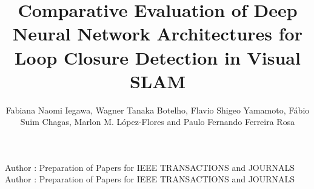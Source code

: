 \documentclass{ieeeaccess}
\begin{document}

\title{Comparative Evaluation of Deep Neural Network Architectures for Loop Closure Detection in Visual SLAM}

\author{Fabiana Naomi Iegawa, Wagner Tanaka Botelho, Flavio Shigeo Yamamoto, Fábio Suim Chagas, Marlon M. López-Flores and Paulo Fernando Ferreira Rosa}

\address[1]{Federal University of ABC, Centre os Mathematics, Computation and Cognition, Santo André, São Paulo - SP, Brazil (e-mail: wagner.tanaka@ufabc.edu.br)}
\address[2]{Startup NTU Software Technology, São Paulo, São Paulo - SP, Brazil}
\address[3]{Department of Design, Norwegian University of Science and Technology, Skippergata, 14 7042 Trondheim, Norway}
\address[4]{Laboratory for Artificial Intelligence, Robotics and Cybernetics - LIARC, Military Institute of Engineering - IME-RJ, Rio de Janeiro, Brazil}

\markboth
{Author \headeretal: Preparation of Papers for IEEE TRANSACTIONS and JOURNALS}
{Author \headeretal: Preparation of Papers for IEEE TRANSACTIONS and JOURNALS}

\end{document}

